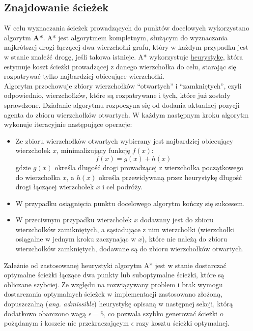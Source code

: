 \documentclass[a4paper, 12pt]{article}
\begin{document}
\newpage
        \subsection{Znajdowanie ścieżek}
        \label{sec:path-finding}

W celu wyznaczania ścieżek prowadzących do punktów docelowych wykorzystano algorytm \textbf{A*}. A* jest algorytmem kompletnym, służącym do wyznaczania najkrótszej drogi łączącej dwa wierzchołki grafu, który w każdym przypadku jest w stanie znaleźć drogę, jeśli takowa istnieje. A* wykorzystuje \hyperref[sec:path-deviation]{heurystykę}, która estymuje koszt ścieżki prowadzącej z danego wierzchołka do celu, starając się rozpatrywać tylko najbardziej obiecujące wierzchołki. \\

\noindent
Algorytm przochowuje zbiory wierzchołków ``otwartych'' i ``zamkniętych'', czyli odpowiednio, wierzchołków, które są rozpatrywane i tych, które już zostały sprawdzone. Działanie algorytmu rozpoczyna się od dodania aktualnej pozycji agenta do zbioru wierzchołków otwartych. W każdym następnym kroku algorytm wykonuje iteracyjnie następujące operacje:

        \begin{itemize}
            \item Ze zbioru wierzchołków otwartych wybierany jest najbardziej obiecujący wierzchołek $x$, minimalizujący funkcję $f(x)$:
              \[ f(x) = g(x) + h(x) \]
              gdzie $g(x)$ określa długość drogi prowadzącej z wierzchołka początkowego do wierzchołka $x$, a $h(x)$ określa przewidywaną przez heurystykę długość drogi łączącej wierzchołek $x$ i cel podróży.
            \item W przypadku osiągnięcia punktu docelowego algorytm kończy się sukcesem.
            \item W przeciwnym przypadku wierzchołek $x$ dodawany jest do zbioru wierzchołków zamikniętych, a sąsiadujące z nim wierzchołki (wierzchołki osiągalne w jednym kroku zaczynając w $x$), które nie należą do zbioru wierzchołków zamkniętych, dodawane są do zbioru wierzchołków otwartych.
        \end{itemize}

\noindent
Zależnie od zastosowanej heurystyki algorytm A* jest w stanie dostarczać optymalne ścieżki łączące dwa punkty lub suboptymalne ścieżki, które są obliczane szybciej. Ze względu na rozwiązywany problem i brak wymogu dostarczania optymalnych ścieżek w implementacji zastosowano złożoną, dopuszczalną (\emph{ang. admissible}) heurystykę opisaną w następnej sekcji, którą dodatkowo obarczono wagą $\epsilon = 5$, co pozwala szybko generować ścieżki o pożądanym i koszcie nie przekraczającym $\epsilon$ razy kosztu ścieżki optymalnej.
\end{document}
